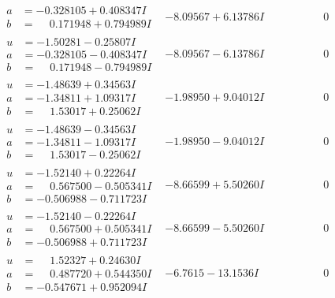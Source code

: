 \documentclass[1p]{elsarticle_modified}
\theoremstyle{definition}
\begin{document}
$$\begin{array}{c|c|c}
\begin{aligned}
a &= -0.328105 + 0.408347 I \\
b &= \phantom{-}0.171948 + 0.794989 I\end{aligned}
 & -8.09567 + 6.13786 I & \phantom{-0.000000 } 0 \\ \hline\begin{aligned}
u &= -1.50281 - 0.25807 I \\
a &= -0.328105 - 0.408347 I \\
b &= \phantom{-}0.171948 - 0.794989 I\end{aligned}
 & -8.09567 - 6.13786 I & \phantom{-0.000000 } 0 \\ \hline\begin{aligned}
u &= -1.48639 + 0.34563 I \\
a &= -1.34811 + 1.09317 I \\
b &= \phantom{-}1.53017 + 0.25062 I\end{aligned}
 & -1.98950 + 9.04012 I & \phantom{-0.000000 } 0 \\ \hline\begin{aligned}
u &= -1.48639 - 0.34563 I \\
a &= -1.34811 - 1.09317 I \\
b &= \phantom{-}1.53017 - 0.25062 I\end{aligned}
 & -1.98950 - 9.04012 I & \phantom{-0.000000 } 0 \\ \hline\begin{aligned}
u &= -1.52140 + 0.22264 I \\
a &= \phantom{-}0.567500 - 0.505341 I \\
b &= -0.506988 - 0.711723 I\end{aligned}
 & -8.66599 + 5.50260 I & \phantom{-0.000000 } 0 \\ \hline\begin{aligned}
u &= -1.52140 - 0.22264 I \\
a &= \phantom{-}0.567500 + 0.505341 I \\
b &= -0.506988 + 0.711723 I\end{aligned}
 & -8.66599 - 5.50260 I & \phantom{-0.000000 } 0 \\ \hline\begin{aligned}
u &= \phantom{-}1.52327 + 0.24630 I \\
a &= \phantom{-}0.487720 + 0.544350 I \\
b &= -0.547671 + 0.952094 I\end{aligned}
 & -6.7615 - 13.1536 I & \phantom{-0.000000 } 0 \\ \hline\begin{aligned}

\end{aligned}
\end{array}$$
\end{document}
